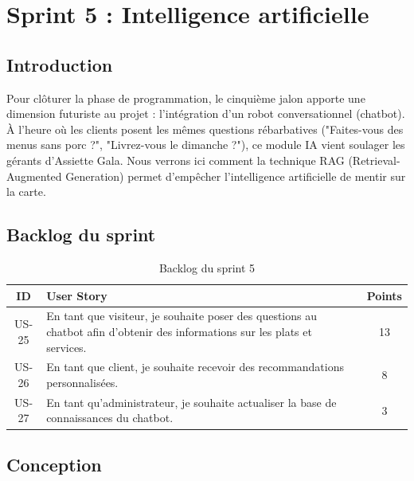 \chapter{Sprint 5 : Intelligence artificielle}

\section{Introduction}

Pour clôturer la phase de programmation, le cinquième jalon apporte une dimension futuriste au projet : l'intégration d'un robot conversationnel (chatbot). À l'heure où les clients posent les mêmes questions rébarbatives ("Faites-vous des menus sans porc ?", "Livrez-vous le dimanche ?"), ce module IA vient soulager les gérants d'Assiette Gala. Nous verrons ici comment la technique RAG (Retrieval-Augmented Generation) permet d'empêcher l'intelligence artificielle de mentir sur la carte.

\section{Backlog du sprint}

\begin{table}[H]
    \centering
    \caption{Backlog du sprint 5}
    \label{tab:backlog_sprint5}
    \renewcommand{\arraystretch}{1.3}
    \begin{tabular}{|c|p{8cm}|c|}
        \hline
        \textbf{ID} & \textbf{User Story} & \textbf{Points} \\
        \hline
        US-25 & En tant que visiteur, je souhaite poser des questions au chatbot afin d'obtenir des informations sur les plats et services. & 13 \\
        \hline
        US-26 & En tant que client, je souhaite recevoir des recommandations personnalisées. & 8 \\
        \hline
        US-27 & En tant qu'administrateur, je souhaite actualiser la base de connaissances du chatbot. & 3 \\
        \hline
    \end{tabular}
\end{table}

\section{Conception}

